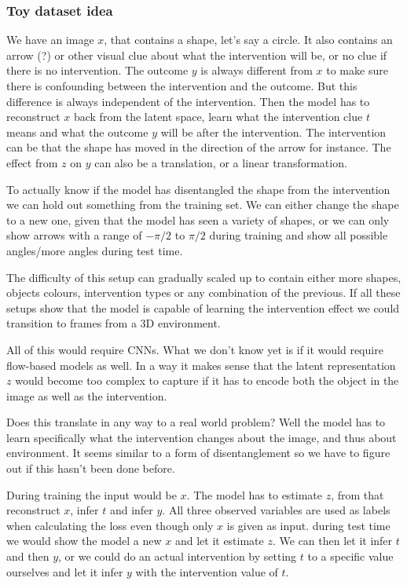 \documentclass{article}
\begin{document}

\subsubsection*{Toy dataset idea}
We have an image $x$, that contains a shape, let's say a circle. It also contains an arrow (?) or other visual clue about what the intervention will be, or no clue if there is no intervention. The outcome $y$ is always different from $x$ to make sure there is confounding between the intervention and the outcome. But this difference is always independent of the intervention. Then the model has to reconstruct $x$ back from the latent space, learn what the intervention clue $t$ means and what the outcome $y$ will be after the intervention. The intervention can be that the shape has moved in the direction of the arrow for instance. The effect from $z$ on $y$ can also be a translation, or a linear transformation.

To actually know if the model has disentangled the shape from the intervention we can hold out something from the training set. We can either change the shape to a new one, given that the model has seen a variety of shapes, or we can only show arrows with a range of $-\pi/2$ to $\pi/2$ during training and show all possible angles/more angles during test time.

The difficulty of this setup can gradually scaled up to contain either more shapes, objects colours, intervention types or any combination of the previous. If all these setups show that the model is capable of learning the intervention effect we could transition to frames from a 3D environment.

All of this would require CNNs. What we don't know yet is if it would require flow-based models as well. In a way it makes sense that the latent representation $z$ would become too complex to capture if it has to encode both the object in the image as well as the intervention. 

Does this translate in any way to a real world problem? Well the model has to learn specifically what the intervention changes about the image, and thus about environment. It seems similar to a form of disentanglement so we have to figure out if this hasn't been done before.

During training the input would be $x$. The model has to estimate $z$, from that reconstruct $x$, infer $t$ and infer $y$. All three observed variables are used as labels when calculating the loss even though only $x$ is given as input. during test time we would show the model a new $x$ and let it estimate $z$. We can then let it infer $t$ and then $y$, or we could do an actual intervention by setting $t$ to a specific value ourselves and let it infer $y$ with the intervention value of $t$.
\end{document}
